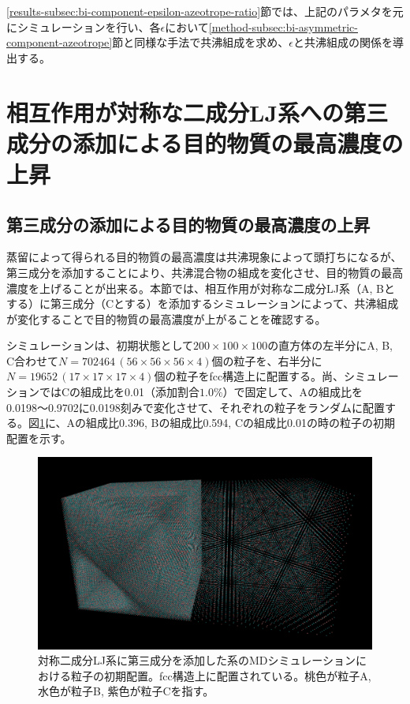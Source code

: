 \documentclass[titlepage]{jsreport}
\begin{document}
\ref{results-subsec:bi-component-epsilon-azeotrope-ratio}節では、上記のパラメタを元にシミュレーションを行い、各$\epsilon$において\ref{method-subsec:bi-asymmetric-component-azeotrope}節と同様な手法で共沸組成を求め、$\epsilon$と共沸組成の関係を導出する。


\section{相互作用が対称な二成分LJ系への第三成分の添加による目的物質の最高濃度の上昇} \label{method-sec:bi-component-addition-of-3rd-component-highest-purity}
\subsection{第三成分の添加による目的物質の最高濃度の上昇} \label{method-subsec:bi-component-addition-of-3rd-component-highest-purity}
蒸留によって得られる目的物質の最高濃度は共沸現象によって頭打ちになるが、第三成分を添加することにより、共沸混合物の組成を変化させ、目的物質の最高濃度を上げることが出来る\cite{azeotrope-add_third_component}。本節では、相互作用が対称な二成分LJ系（A, Bとする）に第三成分（Cとする）を添加するシミュレーションによって、共沸組成が変化することで目的物質の最高濃度が上がることを確認する。

シミュレーションは、初期状態として$200×100×100$の直方体の左半分にA, B, C合わせて$N=702464\,(56×56×56×4)$個の粒子を、右半分に$N=19652\,(17×17×17×4)$個の粒子をfcc構造上に配置する。尚、シミュレーションではCの組成比を0.01（添加割合$1.0\%$）で固定して、Aの組成比を0.0198〜0.9702に0.0198刻みで変化させて、それぞれの粒子をランダムに配置する。図\ref{fig:lan278176-lbn417263-lcn7025-ran7782-rbn11673-rcn197-first}に、Aの組成比0.396, Bの組成比0.594, Cの組成比0.01の時の粒子の初期配置を示す。

\begin{figure}[htbp]
    \begin{center}
        \includegraphics[width=14cm]{fig/lan278176-lbn417263-lcn7025-ran7782-rbn11673-rcn197/lan278176-lbn417263-lcn7025-ran7782-rbn11673-rcn197-first.png}
    \end{center}
    \caption{対称二成分LJ系に第三成分を添加した系のMDシミュレーションにおける粒子の初期配置。fcc構造上に配置されている。桃色が粒子A, 水色が粒子B, 紫色が粒子Cを指す。}
    \label{fig:lan278176-lbn417263-lcn7025-ran7782-rbn11673-rcn197-first}
\end{figure}
\end{document}
